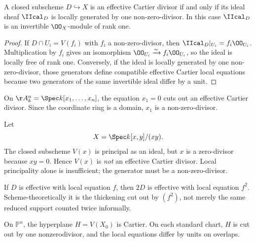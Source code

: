 \begin{theorem}\label{thm:vi40-effective-ideal}
A closed subscheme \(D\hookrightarrow X\) is an effective Cartier divisor if and only if its ideal sheaf \(\IIcal_D\) is locally generated by one non-zero-divisor.  In this case \(\IIcal_D\) is an invertible \(\OO_X\)-module of rank one.
\end{theorem}

\begin{proof}
If \(D\cap U_i=V(f_i)\) with \(f_i\) a non-zero-divisor, then \(\IIcal_D|_{U_i}=f_i\OO_{U_i}\).  Multiplication by \(f_i\) gives an isomorphism \(\OO_{U_i}\xrightarrow{\sim}f_i\OO_{U_i}\), so the ideal is locally free of rank one.  Conversely, if the ideal is locally generated by one non-zero-divisor, those generators define compatible effective Cartier local equations because two generators of the same invertible ideal differ by a unit.
\end{proof}



\begin{example}\label{ex:vi40-affine-hyperplane}
On \(\AA^n_k=\Spec k[x_1,\ldots,x_n]\), the equation \(x_1=0\) cuts out an effective Cartier divisor.  Since the coordinate ring is a domain, \(x_1\) is a non-zero-divisor.
\end{example}

\begin{example}\label{ex:vi40-zero-divisor-warning}
Let
\[
 X=\Spec k[x,y]/(xy).
\]
The closed subscheme \(V(x)\) is principal as an ideal, but \(x\) is a zero-divisor because \(xy=0\).  Hence \(V(x)\) is \emph{not} an effective Cartier divisor.  Local principality alone is insufficient; the generator must be a non-zero-divisor.
\end{example}

\begin{example}\label{ex:vi40-double}
If \(D\) is effective with local equation \(f\), then \(2D\) is effective with local equation \(f^2\).  Scheme-theoretically it is the thickening cut out by \((f^2)\), not merely the same reduced support counted twice informally.
\end{example}

\begin{example}\label{ex:vi40-expand-02}
On $\mathbb P^n$, the hyperplane $H=V(X_0)$ is Cartier.  On each standard chart, $H$ is cut out by one nonzerodivisor, and the local equations differ by units on overlaps.
\end{example}
